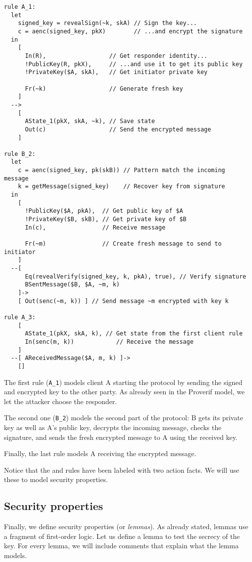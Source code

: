 \begin{lstlisting}
rule A_1:
  let
    signed_key = revealSign(~k, skA) // Sign the key...
    c = aenc(signed_key, pkX)        // ...and encrypt the signature
  in
    [ 
      In(R),                  // Get responder identity...
      !PublicKey(R, pkX),     // ...and use it to get its public key
      !PrivateKey($A, skA),   // Get initiator private key

      Fr(~k)                  // Generate fresh key
    ]
  -->
    [ 
      AState_1(pkX, skA, ~k), // Save state
      Out(c)                  // Send the encrypted message 
    ]

rule B_2:
  let
    c = aenc(signed_key, pk(skB)) // Pattern match the incoming message
    k = getMessage(signed_key)    // Recover key from signature
  in
    [ 
      !PublicKey($A, pkA),  // Get public key of $A
      !PrivateKey($B, skB), // Get private key of $B
      In(c),                // Receive message
      
      Fr(~m)                // Create fresh message to send to initiator
    ]
  --[ 
      Eq(revealVerify(signed_key, k, pkA), true), // Verify signature
      BSentMessage($B, $A, ~m, k)
    ]->
    [ Out(senc(~m, k)) ] // Send message ~m encrypted with key k 

rule A_3:
    [ 
      AState_1(pkX, skA, k), // Get state from the first client rule
      In(senc(m, k))            // Receive the message
    ]
  --[ AReceivedMessage($A, m, k) ]-> 
    []
\end{lstlisting}

The first rule (\lstinline{A_1}) models client A starting the protocol by sending the signed and encrypted key to the other party. As already seen in the Proverif model, we let the attacker choose the responder.

The second one (\lstinline{B_2}) models the second part of the protocol: B gets its private key as well as A's public key, decrypts the incoming message, checks the signature, and sends the fresh encrypted message to A using the received key.

Finally, the last rule models A receiving the encrypted message.

Notice that the  and  rules have been labeled with two action facts. We will use these to model security properties.

\subsection{Security properties}
Finally, we define security properties (or \textit{lemmas}). As already stated, lemmas use a fragment of first-order logic. Let us define a lemma to test the secrecy of the key. For every lemma, we will include comments that explain what the lemma models.

